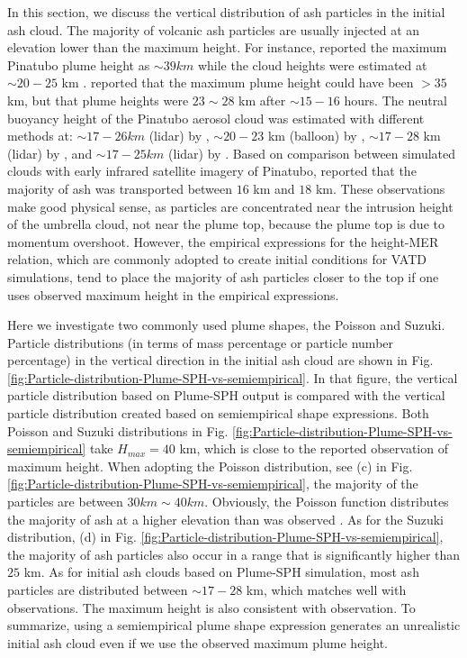 \documentclass[utf8]{frontiersSCNS} %
\begin{document}
In this section, we discuss the vertical distribution of ash particles in the initial ash cloud.
The majority of volcanic ash particles are usually  injected at an elevation lower than the maximum height. For instance, \citet{holasek1996satellite, holasek1996experiments} reported the maximum Pinatubo plume height as $\sim 39 km$ while the cloud heights were estimated at $\sim 20  - 25$ km . \citet{self1993atmospheric} reported that the maximum plume height could have been $>35$ km, but that plume heights were $23 \sim 28$ km after $\sim 15-16$ hours. The neutral buoyancy height of the Pinatubo aerosol cloud was estimated with different methods at: $\sim 17-26 km$ (lidar) by \citet{defoor1992early}, $\sim 20-23$ km (balloon) by \citet{deshler1992balloonborne}, $\sim 17-28$ km (lidar) by \citet{jager1992pinatubo}, and $\sim 17-25 km$ (lidar) by \citet{avdyushin19931}. Based on comparison between simulated clouds with early infrared satellite imagery of Pinatubo, \citet{fero2008simulation} reported that the majority of ash was transported between $16$ km and $18$ km. These observations make good physical sense, as particles are concentrated near the intrusion height of the umbrella cloud, not near the plume top, because the plume top is due to momentum overshoot. However, the empirical expressions for the height-MER relation, which are commonly adopted to create initial conditions for VATD simulations, tend to place the majority of ash particles closer to the top if one uses observed maximum height in the empirical expressions.

Here we investigate two commonly used plume shapes, the Poisson and Suzuki.
Particle distributions (in terms of mass percentage or particle number percentage) in the vertical direction in the initial ash cloud are shown in Fig. \ref{fig:Particle-distribution-Plume-SPH-vs-semiempirical}. In that figure, the vertical particle distribution based on Plume-SPH output is compared with the vertical particle distribution created based on semiempirical shape expressions. Both Poisson and Suzuki distributions in Fig. \ref{fig:Particle-distribution-Plume-SPH-vs-semiempirical} take $H_{max} = 40$ km, which is close to the reported observation of maximum height. When adopting the Poisson distribution, see (c) in  Fig. \ref{fig:Particle-distribution-Plume-SPH-vs-semiempirical}, the majority of the particles are between $30 km \sim 40 km$. Obviously, the Poisson function distributes the majority of ash at a higher elevation than was observed \citep[e.g.][]{fero2008simulation}. As for the Suzuki distribution, (d) in  Fig. \ref{fig:Particle-distribution-Plume-SPH-vs-semiempirical}, the majority of ash particles also occur in a range that is significantly higher than $25 $ km. As for initial ash clouds based on Plume-SPH simulation, most ash particles are distributed between $\sim 17-  28$ km, which matches well with observations. The maximum height is also consistent with observation. To summarize, using a semiempirical plume shape expression generates an unrealistic initial ash cloud even if we use the observed maximum plume height.
\end{document}
